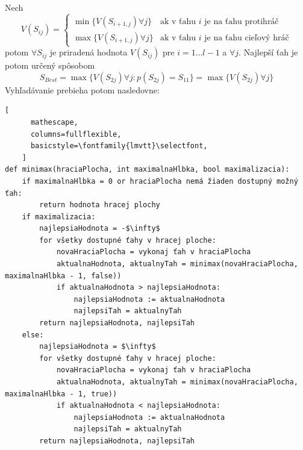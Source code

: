 Nech
\begin{equation}
    V(S_{ij}) =
    \begin{cases}
        \min{\{V(S_{i+1,j}) \forall j\}} & \text{ak v ťahu } i \text{ je na ťahu protihráč} \\
        \max{\{V(S_{i+1,j}) \forall j\}} & \text{ak v ťahu } i \text{ je na ťahu cieľový hráč}
    \end{cases}
\end{equation}
potom $\forall S_{ij}$ je priradená hodnota $V(S_{ij})$ pre $i = 1 \dots l-1$ a $\forall j$.
Najlepší ťah je potom určený spôsobom
\begin{equation}
    S_{Best} = \max{\{V(S_{2j}) \forall j \colon p(S_{2j}) = S_{11}\}} = \max{\{V(S_{2j}) \forall j\}}
\end{equation}
Vyhľadávanie prebieha potom nasledovne:\cite{algo_minimax_pseudocode}
\begin{tiny}
    \begin{lstlisting}[
      mathescape,
      columns=fullflexible,
      basicstyle=\fontfamily{lmvtt}\selectfont,
    ]
def minimax(hraciaPlocha, int maximalnaHlbka, bool maximalizacia):
    if maximalnaHlbka = 0 or hraciaPlocha nemá žiaden dostupný možný ťah:
        return hodnota hracej plochy
    if maximalizacia:
        najlepsiaHodnota = -$\infty$
        for všetky dostupné ťahy v hracej ploche:
            novaHraciaPlocha = vykonaj ťah v hraciaPlocha
            aktualnaHodnota, aktualnyTah = minimax(novaHraciaPlocha, maximalnaHlbka - 1, false))
            if aktualnaHodnota > najlepsiaHodnota:
                najlepsiaHodnota := aktualnaHodnota
                najlepsiTah = aktualnyTah
        return najlepsiaHodnota, najlepsiTah
    else:
        najlepsiaHodnota = $\infty$
        for všetky dostupné ťahy v hracej ploche:
            novaHraciaPlocha = vykonaj ťah v hraciaPlocha
            aktualnaHodnota, aktualnyTah = minimax(novaHraciaPlocha, maximalnaHlbka - 1, true))
            if aktualnaHodnota < najlepsiaHodnota:
                najlepsiaHodnota := aktualnaHodnota
                najlepsiTah = aktualnyTah
        return najlepsiaHodnota, najlepsiTah
\end{lstlisting}
\end{tiny}

